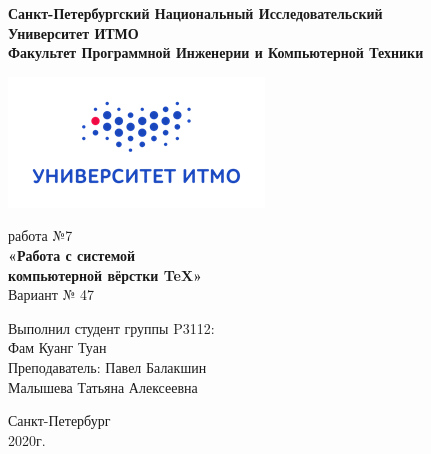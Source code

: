 \thispagestyle{empty}
\begin{center}
    \Large
    \textbf{Санкт-Петербургский Национальный Исследовательский\\Университет ИТМО\\Факультет Программной Инженерии и Компьютерной Техники}
    
    \smallskip
    \hspace{2mm}\includegraphics{ITMO.png}
    
    \vspace{3.5cm}
    
     работа №7\\
    \textbf{«Работа с системой\\
    компьютерной вёрстки \TeX»}\\
    Вариант № 47
\end{center}

\vspace{3cm}

\begin{flushright}
    \LARGE
    Выполнил студент группы P3112:\\
    Фам Куанг Туан\\
    Преподаватель: Павел Балакшин\\
    Малышева Татьяна Алексеевна\\
\end{flushright}

\vspace{4.5cm}
\begin{center}
    \LARGE
    Санкт-Петербург\\
    2020г.
\end{center}